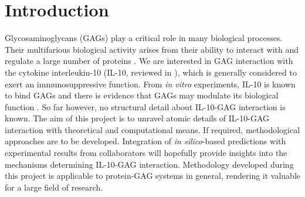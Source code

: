 \chapter{Introduction}

Glycosaminoglycans (GAGs) play a critical role in many biological processes.
Their multifarious biological activity arises from their ability to interact
with and regulate a large number of proteins \cite{handel:2005}. We are
interested in GAG interaction with the cytokine interleukin-10 (IL-10, reviewed
in \cite{moore:2001}), which is generally considered to exert an
immunosuppressive function. From \textit{in vitro} experiments, IL-10 is known
to bind GAGs and there is evidence that GAGs may modulate its biological
function \cite{salek_ardakani:2000}. So far however, no structural detail about
IL-10-GAG interaction is known. The aim of this project is to unravel atomic
details of IL-10-GAG interaction with theoretical and computational means. If
required, methodological approaches are to be developed. Integration of
\textit{in silico}-based predictions with experimental results from
collaborators will hopefully provide insights into the mechanisms determining
IL-10-GAG interaction. Methodology developed during this project is applicable
to protein-GAG systems in general, rendering it valuable for a large field of
research.


\lipsum[1-10]